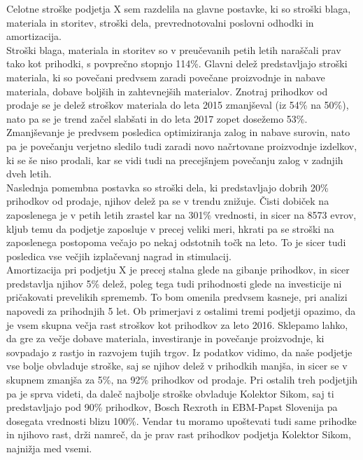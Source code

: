\documentclass[12pt,a4paper]{amsart}
\theoremstyle{definition} %
\theoremstyle{plain} %
\begin{document}
Celotne stroške podjetja X sem razdelila na glavne postavke, ki so stroški blaga, materiala in storitev, stroški dela, prevrednotovalni poslovni odhodki in amortizacija.\\
Stroški blaga, materiala in storitev so v preučevanih petih letih naraščali prav tako kot prihodki, s povprečno stopnjo 114\%. Glavni delež predstavljajo stroški materiala, ki so povečani predvsem zaradi povečane proizvodnje in nabave materiala, dobave boljših in zahtevnejših materialov. Znotraj prihodkov od prodaje se je delež stroškov materiala do leta 2015 zmanjševal (iz 54\% na 50\%), nato pa se je trend začel slabšati in do leta 2017 zopet dosežemo 53\%. Zmanjševanje je predvsem posledica optimiziranja zalog in nabave surovin, nato pa je povečanju verjetno sledilo tudi zaradi novo načrtovane proizvodnje izdelkov, ki se še niso prodali, kar se vidi tudi na precejšnjem povečanju zalog v zadnjih dveh letih.\\
Naslednja pomembna postavka so stroški dela, ki predstavljajo dobrih 20\% prihodkov od prodaje, njihov delež pa se v trendu znižuje. Čisti dobiček na zaposlenega je v petih letih zrastel kar na 301\% vrednosti, in sicer na 8573 evrov, kljub temu da podjetje zaposluje v precej veliki meri, hkrati pa se stroški na zaposlenega postopoma večajo po nekaj odstotnih točk na leto. To je sicer tudi posledica vse večjih izplačevanj nagrad in stimulacij.\\
Amortizacija pri podjetju X je precej stalna glede na gibanje prihodkov, in sicer predstavlja njihov 5\% delež, poleg tega tudi prihodnosti glede na investicije ni pričakovati prevelikih sprememb. To bom omenila predvsem kasneje, pri analizi napovedi za prihodnjih 5 let.
Ob primerjavi z ostalimi tremi podjetji opazimo, da je vsem skupna večja rast stroškov kot prihodkov za leto 2016. Sklepamo lahko, da gre za večje dobave materiala, investiranje in povečanje proizvodnje, ki sovpadajo z rastjo in razvojem tujih trgov. Iz podatkov vidimo, da naše podjetje vse bolje obvladuje stroške, saj se njihov delež v prihodkih manjša, in sicer se v skupnem zmanjša za 5\%, na 92\% prihodkov od prodaje. Pri ostalih treh podjetjih pa je sprva videti, da daleč najbolje stroške obvladuje Kolektor Sikom, saj ti predstavljajo pod 90\% prihodkov, Bosch Rexroth in EBM-Papst Slovenija pa dosegata vrednosti blizu 100\%. Vendar tu moramo upoštevati tudi same prihodke in njihovo rast, drži namreč, da je prav rast prihodkov podjetja Kolektor Sikom, najnižja med vsemi.\\
\end{document}
